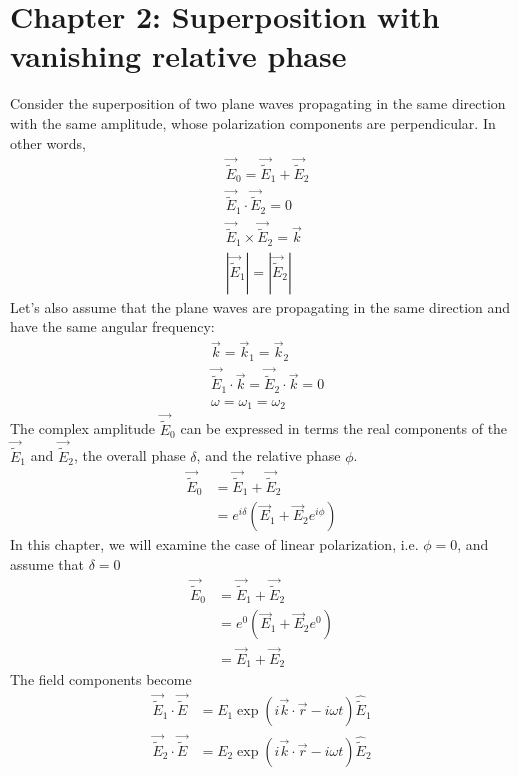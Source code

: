 \documentclass{article}
\begin{document}
\section{Chapter 2: Superposition with vanishing relative phase}
Consider the superposition of two plane waves propagating in the same direction with the same amplitude, whose polarization components are perpendicular.  In other words,
\begin{align}    
    &\vec{\widetilde{E}}_0  = \vec{\widetilde{E}}_1 + \vec{\widetilde{E}}_2 \\
    &\vec{\widetilde{E}}_1 \cdot \vec{\widetilde{E}}_2 = 0 \\ 
    &\vec{\widetilde{E}}_1 \times \vec{\widetilde{E}}_2 = \vec{k} \\
    &\left|\vec{\widetilde{E}}_1\right| = \left|\vec{\widetilde{E}}_2 \right|
\end{align}
Let's also assume that the plane waves are propagating in the same direction and have the same angular frequency:
\begin{align}
    &\vec{k} = \vec{k}_1 = \vec{k}_2 \\
    &\vec{\widetilde{E}}_1 \cdot \vec{k} = \vec{\widetilde{E}}_2 \cdot \vec{k}  = 0 \\
    &\omega = \omega_1 = \omega_2 
\end{align}
The complex amplitude $\vec{\widetilde{E}}_0$ can be expressed in terms the real components of the $\vec{\widetilde{E}}_1$ and $\vec{\widetilde{E}}_2$, the overall phase $\delta$, and the relative phase $\phi$.
\begin{align}    
    \vec{\widetilde{E}}_0  &= \vec{\widetilde{E}}_1 + \vec{\widetilde{E}}_2 \\
    &= e^{i\delta}\left(\vec{E}_1 + \vec{E}_2 e^{i\phi}\right)
\end{align}
In this chapter, we will examine the case of linear polarization, i.e. $\phi=0$, and assume that $\delta=0$
\begin{align}    
    \vec{\widetilde{E}}_0  &= \vec{\widetilde{E}}_1 + \vec{\widetilde{E}}_2 \\
    &= e^{0}\left(\vec{E}_1 + \vec{E}_2 e^{0}\right)\\
    &= \vec{E}_1 + \vec{E}_2 \label{c2__e0_decomposed}
\end{align}
The field components become
\begin{align}
    \vec{\widetilde{E}}_1 \cdot  \vec{\widetilde{E}} &= E_1 \exp \left(i \vec{k} \cdot \vec{r} - i \omega t\right) \hat{\widetilde{E}}_1 \\
    \vec{\widetilde{E}}_2 \cdot  \vec{\widetilde{E}} &= E_2 \exp \left(i \vec{k} \cdot \vec{r} - i \omega t\right) \hat{\widetilde{E}}_2 \\
\end{align}
\end{document}
